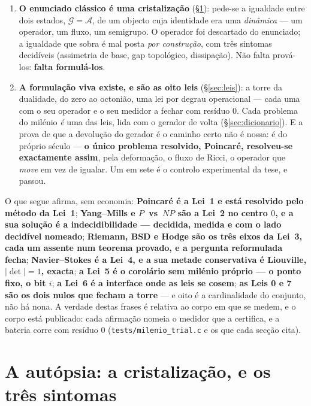 \documentclass[11pt,a4paper]{article}
\newcommand{\code}[1]{\texttt{\small #1}}
\begin{document}
\begin{enumerate}
\item \textbf{O enunciado clássico é uma cristalização} (\S\ref{sec:autopsia}): pede-se a igualdade
  entre dois estados, $\mathcal G=\mathcal A$, de um objecto cuja identidade era uma \emph{dinâmica}
  --- um operador, um fluxo, um semigrupo. O operador foi descartado do enunciado; a igualdade que
  sobra é mal posta \emph{por construção}, com três sintomas decidíveis (assimetria de base, gap
  topológico, dissipação). Não falta prová-los: \textbf{falta formulá-los}.
\item \textbf{A formulação viva existe, e são as oito leis} (\S\ref{sec:leis}): a torre da dualidade,
  do zero ao octonião, uma lei por degrau operacional --- cada uma com o seu operador e o seu medidor
  a fechar com resíduo $0$. Cada problema do milénio \emph{é} uma das leis, lida com o gerador de
  volta (\S\ref{sec:dicionario}). E a prova de que a devolução do gerador é o caminho certo não é
  nossa: é do próprio século --- \textbf{o único problema resolvido, Poincaré, resolveu-se
  exactamente assim}, pela deformação, o fluxo de Ricci, o operador que \emph{move} em vez de igualar.
  Um em sete é o controlo experimental da tese, e passou.
\end{enumerate}

\noindent O que segue afirma, sem economia: \textbf{Poincaré é a Lei~1 e está resolvido pelo método
da Lei~1}; \textbf{Yang--Mills e $P$~vs~$NP$ são a Lei~2 no centro $0$, e a sua solução é a
indecidibilidade --- decidida, medida e com o lado decidível nomeado}; \textbf{Riemann, BSD e Hodge
são os três eixos da Lei~3, cada um assente num teorema provado, e a pergunta reformulada fecha};
\textbf{Navier--Stokes é a Lei~4, e a sua metade conservativa é Liouville, $|\det|=1$, exacta};
\textbf{a Lei~5 é o corolário sem milénio próprio --- o ponto fixo, o bit $i$}; \textbf{a Lei~6 é a
interface onde as leis se cosem}; \textbf{as Leis 0 e 7 são os dois nulos que fecham a torre} --- e
oito é a cardinalidade do conjunto, não há nona. A verdade destas frases é relativa ao corpo em que
se medem, e o corpo está publicado: cada afirmação nomeia o medidor que a certifica, e a bateria
corre com resíduo $0$ (\code{tests/milenio\_trial.c} e os que cada secção cita).

\section{A autópsia: a cristalização, e os três sintomas}\label{sec:autopsia}
\end{document}
